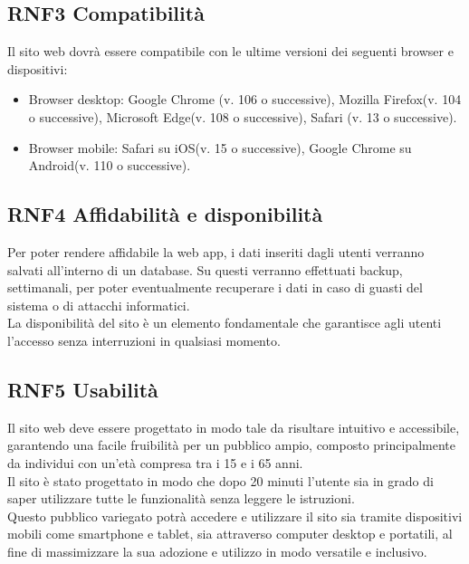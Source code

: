 \documentclass[a4paper,12pt]{article}
\begin{document}
\subsection*{RNF3 Compatibilità}
Il sito web dovrà essere compatibile con le ultime versioni dei seguenti browser e dispositivi:
\begin{itemize}
    \item Browser desktop: Google Chrome (v. 106 o successive), Mozilla Firefox(v. 104 o successive), Microsoft Edge(v. 108 o successive), Safari (v. 13 o successive).
     \item Browser mobile: Safari su iOS(v. 15 o successive), Google Chrome su Android(v. 110 o successive).
\end{itemize}


\subsection*{RNF4 Affidabilità e disponibilità}
Per poter rendere affidabile la web app, i dati inseriti dagli utenti verranno salvati all’interno di un database. Su questi verranno effettuati backup, settimanali, per poter eventualmente recuperare i dati in caso di guasti del sistema o di attacchi informatici.
\\La disponibilità del sito è un elemento fondamentale che garantisce agli utenti l'accesso senza interruzioni in qualsiasi momento.


\subsection*{RNF5 Usabilità}
Il sito web deve essere progettato in modo tale da risultare intuitivo e accessibile, garantendo una facile fruibilità per un pubblico ampio, composto principalmente da individui con un'età compresa tra i 15 e i 65 anni.\\
Il sito è stato progettato in modo che dopo 20 minuti l'utente sia in grado di saper utilizzare tutte le funzionalità senza leggere le istruzioni.\\
Questo pubblico variegato potrà accedere e utilizzare il sito sia tramite dispositivi mobili come smartphone e tablet, sia attraverso computer desktop e portatili, al fine di massimizzare la sua adozione e utilizzo in modo versatile e inclusivo.
\end{document}
